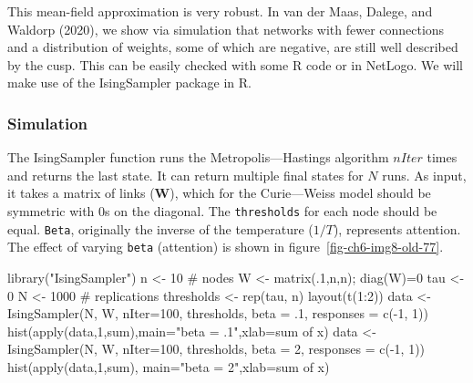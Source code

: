 \documentclass[
  a4paper,
  DIV=11,
  numbers=noendperiod,
  oneside]{scrreprt}
\newenvironment{Shaded}{}{}
\newcommand{\AttributeTok}[1]{\textcolor[rgb]{0.84,0.23,0.29}{#1}}
\newcommand{\CommentTok}[1]{\textcolor[rgb]{0.42,0.45,0.49}{#1}}
\newcommand{\DecValTok}[1]{\textcolor[rgb]{0.00,0.36,0.77}{#1}}
\newcommand{\FunctionTok}[1]{\textcolor[rgb]{0.44,0.26,0.76}{#1}}
\newcommand{\NormalTok}[1]{\textcolor[rgb]{0.14,0.16,0.18}{#1}}
\newcommand{\OtherTok}[1]{\textcolor[rgb]{0.44,0.26,0.76}{#1}}
\newcommand{\SpecialCharTok}[1]{\textcolor[rgb]{0.00,0.36,0.77}{#1}}
\newcommand{\StringTok}[1]{\textcolor[rgb]{0.01,0.18,0.38}{#1}}
\begin{document}
This mean-field approximation is very robust. In van der Maas, Dalege,
and Waldorp (2020), we show via simulation that networks with fewer
connections and a distribution of weights, some of which are negative,
are still well described by the cusp. This can be easily checked with
some R code or in NetLogo. We will make use of the IsingSampler package
in R.

\subsubsection{Simulation}\label{sec-Simulation}

The IsingSampler function runs the Metropolis---Hastings algorithm
\(nIter\) times and returns the last state. It can return multiple final
states for \(N\) runs. As input, it takes a matrix of links
(\(\mathbf{W}\)), which for the Curie---Weiss model should be symmetric
with 0s on the diagonal. The \texttt{thresholds} for each node should be
equal. \texttt{Beta}, originally the inverse of the temperature
(\(1/T\)), represents attention. The effect of varying \texttt{beta}
(attention) is shown in figure~\ref{fig-ch6-img8-old-77}.

\begin{Shaded}
\begin{Highlighting}[]
\FunctionTok{library}\NormalTok{(}\StringTok{"IsingSampler"}\NormalTok{)}
\NormalTok{n }\OtherTok{\textless{}{-}} \DecValTok{10} \CommentTok{\# nodes}
\NormalTok{W }\OtherTok{\textless{}{-}} \FunctionTok{matrix}\NormalTok{(.}\DecValTok{1}\NormalTok{,n,n); }\FunctionTok{diag}\NormalTok{(W)}\OtherTok{=}\DecValTok{0}
\NormalTok{tau }\OtherTok{\textless{}{-}} \DecValTok{0}
\NormalTok{N }\OtherTok{\textless{}{-}} \DecValTok{1000} \CommentTok{\# replications}
\NormalTok{thresholds }\OtherTok{\textless{}{-}} \FunctionTok{rep}\NormalTok{(tau, n)}
\FunctionTok{layout}\NormalTok{(}\FunctionTok{t}\NormalTok{(}\DecValTok{1}\SpecialCharTok{:}\DecValTok{2}\NormalTok{))}
\NormalTok{data }\OtherTok{\textless{}{-}} \FunctionTok{IsingSampler}\NormalTok{(N, W, }\AttributeTok{nIter=}\DecValTok{100}\NormalTok{, thresholds, }
            \AttributeTok{beta =}\NormalTok{ .}\DecValTok{1}\NormalTok{, }\AttributeTok{responses =} \FunctionTok{c}\NormalTok{(}\SpecialCharTok{{-}}\DecValTok{1}\NormalTok{, }\DecValTok{1}\NormalTok{))}
\FunctionTok{hist}\NormalTok{(}\FunctionTok{apply}\NormalTok{(data,}\DecValTok{1}\NormalTok{,sum),}\AttributeTok{main=}\StringTok{"beta = .1"}\NormalTok{,}\AttributeTok{xlab=}\StringTok{\textquotesingle{}sum of x\textquotesingle{}}\NormalTok{)}
\NormalTok{data }\OtherTok{\textless{}{-}} \FunctionTok{IsingSampler}\NormalTok{(N, W, }\AttributeTok{nIter=}\DecValTok{100}\NormalTok{, thresholds, }
            \AttributeTok{beta =} \DecValTok{2}\NormalTok{, }\AttributeTok{responses =} \FunctionTok{c}\NormalTok{(}\SpecialCharTok{{-}}\DecValTok{1}\NormalTok{, }\DecValTok{1}\NormalTok{))}
\FunctionTok{hist}\NormalTok{(}\FunctionTok{apply}\NormalTok{(data,}\DecValTok{1}\NormalTok{,sum), }\AttributeTok{main=}\StringTok{"beta = 2"}\NormalTok{,}\AttributeTok{xlab=}\StringTok{\textquotesingle{}sum of x\textquotesingle{}}\NormalTok{)}
\end{Highlighting}
\end{Shaded}
\end{document}
